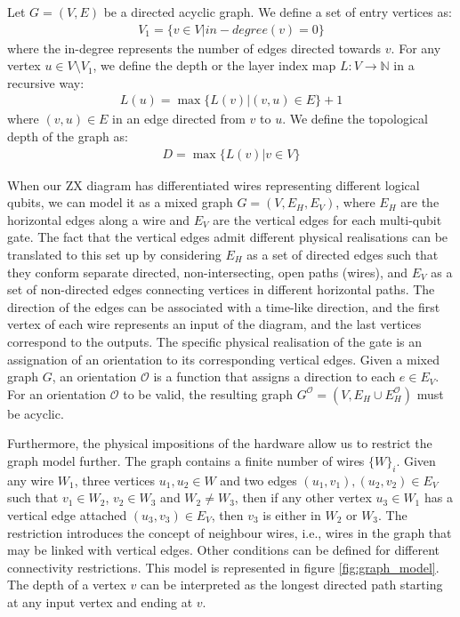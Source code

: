 \documentclass[12pt, twoside, openany]{book}
\begin{document}
\begin{definition}
    Let $G = (V,E)$ be a directed acyclic graph. We define a set of entry vertices as:
    \begin{align*}
        V_1 = \{ v \in V | in-degree(v) = 0\}
    \end{align*}
    where the in-degree represents the number of edges directed towards $v$. For any vertex $u \in V \setminus V_1$, we define the depth or the layer index map $L: V \rightarrow \mathbb{N}$ in a recursive way:
    \begin{align*}
        L(u) = \max\{L(v) | (v, u) \in E\} + 1
    \end{align*}
    where $(v,u)\in E $ in an edge directed from $v$ to $u$. We define the topological depth of the graph as:
    \begin{align*}
        D = \max \{L(v) | v \in V\}
    \end{align*}
    
\end{definition}

When our ZX diagram has differentiated wires representing different logical qubits, we can model it as a mixed graph $G = (V, E_H, E_V)$, where $E_H$ are the horizontal edges along a wire and $E_V$ are the vertical edges for each multi-qubit gate. The fact that the vertical edges admit different physical realisations can be translated to this set up by considering $E_H$ as a set of directed edges such that they conform separate directed, non-intersecting, open paths (wires), and $E_V$ as a set of non-directed edges connecting vertices in different horizontal paths. The direction of the edges can be associated with a time-like direction, and the first vertex of each wire represents an input of the diagram, and the last vertices correspond to the outputs. The specific physical realisation of the gate is an assignation of an orientation to its corresponding vertical edges. Given a mixed graph $G$, an orientation $\mathcal{O}$ is a function that assigns a direction to each $e \in E_V$. For an orientation $\mathcal{O}$ to be valid, the resulting graph $G^\mathcal{O} = (V, E_H \cup E_H^\mathcal{O})$ must be acyclic. 

Furthermore, the physical impositions of the hardware allow us to restrict the graph model further. The graph contains a finite number of wires $\{W\}_i$. Given any wire $W_1$, three vertices $u_1, u_2 \in W$ and two edges $(u_1, v_1), (u_2, v_2) \in E_V$ such that $v_1 \in W_2$, $v_2 \in W_3$ and $W_2 \neq W_3$, then if any other vertex $u_3 \in W_1$ has a vertical edge attached $(u_3, v_3) \in E_V$, then $v_3$ is either in $W_2$ or $W_3$. The restriction introduces the concept of neighbour wires, i.e., wires in the graph that may be linked with vertical edges. Other conditions can be defined for different connectivity restrictions. This model is represented in figure \ref{fig:graph_model}. The depth of a vertex $v$ can be interpreted as the longest directed path starting at any input vertex and ending at $v$.
\end{document}

